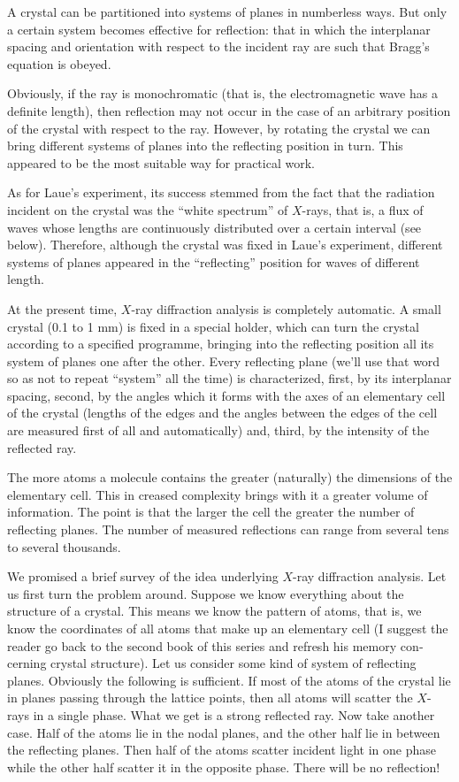 A crystal can be partitioned into systems of planes in numberless ways. But only a certain system becomes effective for reflection: that in which the interplanar spacing and orientation with respect to the incident ray are such that Bragg's equation is obeyed.

Obviously, if the ray is monochromatic (that is, the electromagnetic wave has a definite length), then reflec­tion may not occur in the case of an arbitrary position of the crystal with respect to the ray. However, by ro­tating the crystal we can bring different systems of planes into the reflecting position in turn. This appeared to be the most suitable way for practical work.

As for Laue's experiment, its success stemmed from the fact that the radiation incident on the crystal was the ``white spectrum'' of $X$-rays, that is, a flux of waves whose lengths are continuously distributed over a certain interval (see below). Therefore, although the crystal was fixed in Laue's experiment, different systems of planes appeared in the ``reflecting'' position for waves of different length.

At the present time, $X$-ray diffraction analysis is completely automatic. A small crystal (0.1 to 1 mm) is fixed in a special holder, which can turn the crystal according to a specified programme, bringing into the reflecting position all its system of planes one after the other. Every reflecting plane (we'll use that word so as not to repeat ``system'' all the time) is characterized, first, by its interplanar spacing, second, by the angles which it forms with the axes of an elementary cell of the crystal (lengths of the edges and the angles between the edges of the cell are measured first of all and automatically) and, third, by the intensity of the reflected ray.

The more atoms a molecule contains the greater (na­turally) the dimensions of the elementary cell. This in­ creased complexity brings with it a greater volume of information. The point is that the larger the cell the greater the number of reflecting planes. The number of measured reflections can range from several tens to sev­eral thousands.

We promised a brief survey of the idea underlying $X$-ray diffraction analysis. Let us first turn the problem around. Suppose we know everything about the structure of a crystal. This means we know the pattern of atoms, that is, we know the coordinates of all atoms that make up an elementary cell (I suggest the reader go back to the second book of this series and refresh his memory con­cerning crystal structure). Let us consider some kind of system of reflecting planes. Obviously the following is sufficient. If most of the atoms of the crystal lie in planes passing through the lattice points, then all atoms will scatter the $X$-rays in a single phase. What we get is a strong reflected ray. Now take another case. Half of the atoms lie in the nodal planes, and the other half lie in between the reflecting planes. Then half of the atoms scatter incident light in one phase while the other half scatter it in the opposite phase. There will be no reflec­tion!

